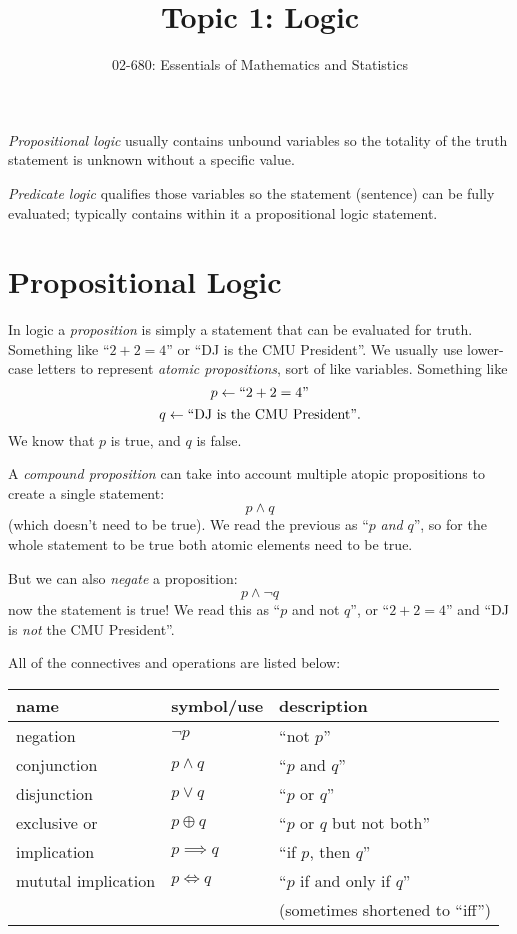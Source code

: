 


\title{Topic 1:  Logic}
\author{02-680: Essentials of Mathematics and Statistics}


\maketitle

\emph{Propositional logic} usually contains unbound variables so the totality of the truth statement is unknown without a specific value. 

\emph{Predicate logic} qualifies those variables so the statement (sentence) can be fully evaluated; typically contains within it a propositional logic statement. 

\section{Propositional Logic}
In logic a \emph{proposition} is simply a statement that can be evaluated for truth. 
Something like ``$2+2=4$'' or ``DJ is the CMU President''. 
We usually use lower-case letters to represent \emph{atomic propositions}, sort of like variables. 
Something like 
\[ p \leftarrow \textnormal{``}2+2=4\textnormal{''}\]
\[ q \leftarrow \textnormal{``DJ is the CMU President''}.\]
We know that $p$ is true, and $q$ is false. 


A \emph{compound proposition} can take into account multiple atopic propositions to create a single statement: 
\[ p \wedge q \]
(which doesn't need to be true). 
We read the previous as ``$p$ \textit{and} $q$'', 
so for the whole statement to be true both atomic elements need to be true. 
 
But we can also \textit{negate} a proposition: 
\[ p \wedge \neg q \]
now the statement is true! 
We read this as ``$p$ and not $q$'', 
or  ``$2+2=4$'' and  ``DJ is \emph{not} the CMU President''.

All of the connectives and operations are listed below: 
\begin{center}
\begin{tabular}{lll}
name 		& symbol/use 		& description\\
\hline 
\hline
negation			& $\neg p$		& ``not $p$''\\
\hline
conjunction		& $p \wedge q$		& ``$p$ and $q$''\\
disjunction		& $p \vee q$		& ``$p$ or $q$''\\
exclusive or		& $p \oplus q$		& ``$p$ or $q$ but not both''\\
\hline
implication		& $p \implies q$	& ``if $p$, then $q$''\\
mututal implication 	& $p \iff q$		& ``$p$ if and only if $q$'' \\
				&				& \hspace{3em}(sometimes shortened to ``iff'')\\
\hline
\end{tabular}
\end{center}

